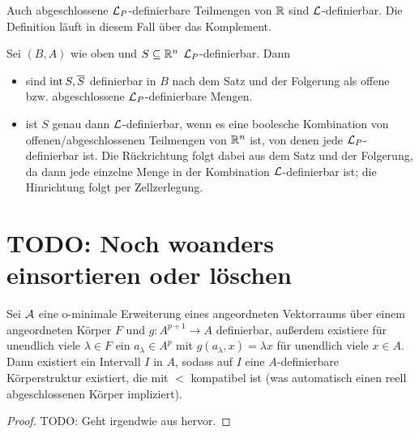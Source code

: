 \begin{corollary}
	Auch abgeschlossene $\mathcal{L}_P$-definierbare Teilmengen von $\mathbb{R}$ sind $\mathcal{L}$-definierbar. Die Definition läuft in diesem Fall über das Komplement.
\end{corollary}
\begin{corollary}
	Sei $(B,A)$ wie oben und $S\subseteq\mathbb{R}^n$ $\mathcal{L}_P$-definierbar. Dann
	\begin{itemize}
		\item sind $\operatorname{int} S,\overline{S}$ definierbar in $B$ nach dem Satz und der Folgerung als offene bzw. abgeschlossene $\mathcal{L}_P$-definierbare Mengen.
		\item ist $S$ genau dann $\mathcal{L}$-definierbar, wenn es eine boolesche Kombination von offenen/abgeschlossenen Teilmengen von $\mathbb{R}^n$ ist, von denen jede $\mathcal{L}_P$-definierbar ist. Die Rückrichtung folgt dabei aus dem Satz und der Folgerung, da dann jede einzelne Menge in der Kombination $\mathcal{L}$-definierbar ist; die Hinrichtung folgt per Zellzerlegung.
	\end{itemize}
\end{corollary}


\newpage
\section{TODO: Noch woanders einsortieren oder löschen}

\begin{lemma}
	Sei $\mathcal{A}$ eine o-minimale Erweiterung eines angeordneten Vektorraums über einem angeordneten Körper $F$ und $g:A^{p+1}\rightarrow A$ definierbar, außerdem existiere für unendlich viele $\lambda\in F$ ein $a_\lambda\in A^p$ mit $g(a_\lambda,x)=\lambda x$ für unendlich viele $x\in A$. Dann existiert ein Intervall $I$ in $A$, sodass auf $I$ eine $A$-definierbare Körperstruktur existiert, die mit $<$ kompatibel ist (was automatisch einen reell abgeschlossenen Körper impliziert).
\end{lemma}
\begin{proof}
	TODO: Geht irgendwie aus \cite{PeterStarch} hervor.
\end{proof}

